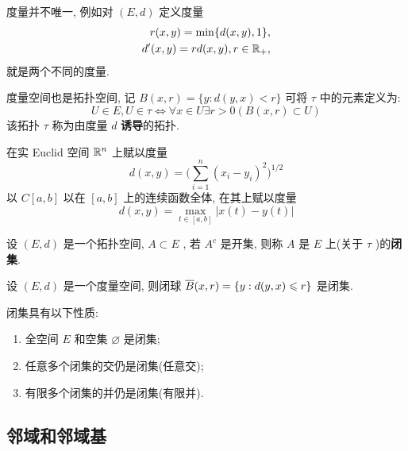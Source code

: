 	\begin{Remark}\label{rmk:度量不唯一}
	   度量并不唯一, 例如对 $ (E, d) $ 定义度量
	   \begin{equation*}
		  \begin{aligned}
			 r(x, y) = \min\{ d(x, y), 1 \}, \\
			 d'(x, y) = rd(x, y), r\in\R_{+},
		  \end{aligned}
	   \end{equation*}
	   就是两个不同的度量.
	\end{Remark}

	度量空间也是拓扑空间, 记 $ B(x, r)=\{ y: d(y, x)<r \} $ 可将 $ \tau $ 中的元素定义为:
	\[
	   U\in E, U\in \tau\Leftrightarrow \forall x\in U\exists r>0(B(x, r)\subset U)
	\]
	该拓扑 $ \tau $ 称为由度量 $ d $ \textbf{诱导}的拓扑.

	\begin{Example}
	   在实 Euclid 空间 $ \R^{n} $ 上赋以度量
	   \begin{equation}
		  d(x, y)=\bigg( \sum_{i=1}^{n}(x_{i}-y_{i})^{2} \bigg)^{1/2}\tag{Euclid距离}
	   \end{equation}
	   以 $ C[a, b] $ 以在 $ [a, b] $ 上的连续函数全体, 在其上赋以度量
		\begin{equation}
		  d(x, y) = \max_{t\in [a, b]} |x(t)-y(t)|\tag{一致距离}
	   \end{equation}
	\end{Example}

	\begin{Definition}[闭集]\label{def:闭集}
	   设 $ (E, d) $ 是一个拓扑空间, $ A\subset E $ , 若 $ A^{c} $ 是开集, 则称 $ A $ 是 $ E $ 上(关于 $ \tau $ )的\textbf{闭集}.
	\end{Definition}
	\begin{Example}
	   设 $ (E, d) $ 是一个度量空间, 则闭球 $ \baro{B}(x, r)=\{ y: d(y, x)\leqslant r \} $ 是闭集.
	\end{Example}
	\begin{Proposition}\label{prop:闭集的性质}
	   闭集具有以下性质:
	   \begin{enumerate}[(1)]
		  \item 全空间 $ E $ 和空集 $ \varnothing $ 是闭集;
		  \item 任意多个闭集的交仍是闭集(任意交);
		  \item 有限多个闭集的并仍是闭集(有限并).
	   \end{enumerate}
	\end{Proposition}

	\subsection{邻域和邻域基}

